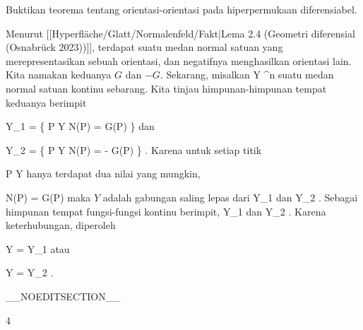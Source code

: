 {

Buktikan teorema tentang orientasi-orientasi pada hiperpermukaan diferensiabel.

}
{

Menurut
[[Hyperfläche/Glatt/Normalenfeld/Fakt|Lema 2.4 (Geometri diferensial (Osnabrück 2023))]],
terdapat suatu medan normal satuan yang merepresentasikan sebuah orientasi, dan negatifnya menghasilkan orientasi lain. Kita namakan keduanya $G$ dan $-G$. Sekarang, misalkan
 { Y } { \R^n
} {}
suatu medan normal satuan kontinu sebarang. Kita tinjau himpunan-himpunan tempat keduanya berimpit

\mavergleichskettedisp
{\vergleichskette
{ Y_1
}
{ =} { \left\{ P \in Y  \mid   N(P) = G(P)         \right\}
}
{ } {
}
{ } {
}
{ } {
}
}
{}{}{}
dan

\mavergleichskettedisp
{\vergleichskette
{ Y_2
}
{ =} { \left\{ P \in Y  \mid   N(P) = - G(P)         \right\}
}
{ } {
}
{ } {
}
{ } {
}
}
{}{}{.}
Karena untuk setiap titik

\mavergleichskette
{\vergleichskette
{ P
}
{ \in }{ Y
}
{  }{
}
{    }{
}
{   }{
}
}
{}{}{}
hanya terdapat dua nilai yang mungkin,

\mavergleichskettedisp
{\vergleichskette
{ N(P)
}
{ =} { \pm G(P)
}
{ } {
}
{ } {
}
{ } {
}
}
{}{}{}
maka $Y$ adalah gabungan saling lepas dari
\mathkor {} {Y_1} {dan} {Y_2} {.}
Sebagai himpunan tempat fungsi-fungsi kontinu berimpit,
\mathkor {} {Y_1} {dan} {Y_2} {}
 {} {.}
Karena keterhubungan, diperoleh

\mavergleichskette
{\vergleichskette
{ Y
}
{ = }{ Y_1
}
{  }{
}
{    }{
}
{   }{
}
}
{}{}{}
atau

\mavergleichskette
{\vergleichskette
{ Y
}
{ = }{ Y_2
}
{  }{
}
{    }{
}
{   }{
}
}
{}{}{.}

 }

__NOEDITSECTION__

{4}

